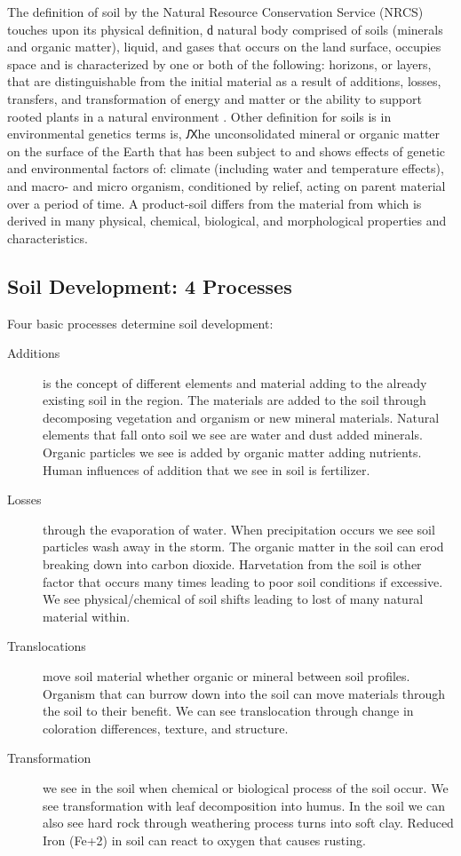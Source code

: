 The definition of soil by the Natural Resource Conservation Service (NRCS) touches upon its physical definition, ԁ natural body comprised of soils (minerals and organic matter), liquid, and gases that occurs on the land surface, occupies space and is characterized by one or both of the following: horizons, or layers, that are distinguishable from the initial material as a result of additions, losses, transfers, and transformation of energy and matter or the ability to support rooted plants in a natural environment \citep{baillie2001soil}. Other definition for soils is in environmental genetics terms is, Ԕhe unconsolidated mineral or organic matter on the surface of the Earth that has been subject to and shows effects of genetic and environmental factors of: climate (including water and temperature effects), and macro- and micro organism, conditioned by relief, acting on parent material over a period of time. A product-soil differs from the material from which is derived in many physical, chemical, biological, and morphological properties and characteristics. 

\subsection{Soil Development: 4 Processes}

Four basic processes determine soil development: 

\begin{description}
	\item[Additions] is the concept of different elements and material adding to the already existing soil in the region. The materials are added to the soil through decomposing vegetation and organism or new mineral materials.  Natural elements that fall onto soil we see are water and dust added minerals. Organic particles we see is added by organic matter adding nutrients. Human influences of addition that we see in soil is fertilizer. 

\item[Losses] through the evaporation of water. When precipitation occurs we see soil particles wash away in the storm. The organic matter in the soil can erod breaking down into carbon dioxide.  Harvetation from the soil is other factor that occurs many times leading to poor soil conditions if excessive. We see physical/chemical of soil shifts leading to lost of many natural material within. 

\item[Translocations] move soil material whether organic or mineral between soil profiles. Organism that can burrow down into the soil can move materials through the soil to their benefit. We can see translocation through change in coloration differences, texture, and structure.

\item[Transformation] we see in the soil when chemical or biological process of the soil occur. We see transformation with leaf decomposition into humus. In the soil we can also see hard rock through weathering process turns into soft clay. Reduced Iron (Fe+2) in soil can react to oxygen that causes rusting.

\end{description}

